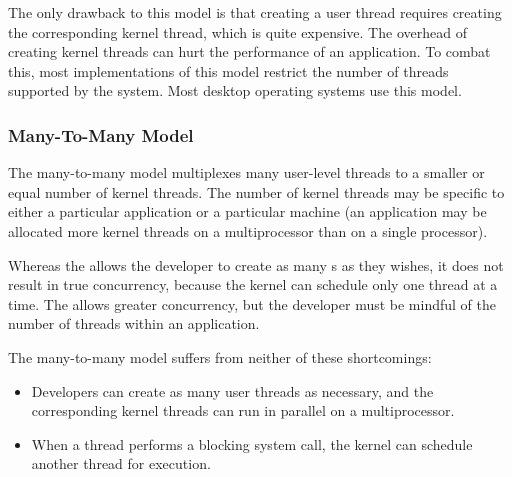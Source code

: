 The only drawback to this model is that creating a user thread requires creating the corresponding kernel thread, which is quite expensive.
The overhead of creating kernel threads can hurt the performance of an application.
To combat this, most implementations of this model restrict the number of threads supported by the system.
Most desktop operating systems use this model.

\subsubsection{Many-To-Many Model}\label{subsubsec:Many_To_Many_Model}
The many-to-many model multiplexes many user-level threads to a smaller or equal number of kernel threads.
The number of kernel threads may be specific to either a particular application or a particular machine (an application may be allocated more kernel threads on a multiprocessor than on a single processor).

Whereas the  allows the developer to create as many s as they wishes, it does not result in true concurrency, because the kernel can schedule only one thread at a time.
The  allows greater concurrency, but the developer must be mindful of the number of threads within an application.

The many-to-many model suffers from neither of these shortcomings:
\begin{itemize}[noitemsep]
\item Developers can create as many user threads as necessary, and the corresponding kernel threads can run in parallel on a multiprocessor.
\item When a thread performs a blocking system call, the kernel can schedule another thread for execution.
\end{itemize}

